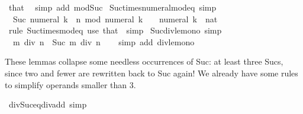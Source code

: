 \begin{isabellebody}
\ that\ \isamarkupfalse%
\ {\isacharparenleft}{\kern0pt}simp\ add{\isacharcolon}{\kern0pt}\ mod{\isacharunderscore}{\kern0pt}Suc{\isacharparenright}{\kern0pt}%
\endisatagproof
{\isafoldproof}%
%
\isadelimproof
\isanewline
%
\endisadelimproof
\isanewline
{}\isamarkupfalse%
\ Suc{\isacharunderscore}{\kern0pt}times{\isacharunderscore}{\kern0pt}numeral{\isacharunderscore}{\kern0pt}mod{\isacharunderscore}{\kern0pt}eq\ {\isacharbrackleft}{\kern0pt}simp{\isacharbrackright}{\kern0pt}{\isacharcolon}{\kern0pt}\isanewline
\ \ {\isachardoublequoteopen}Suc\ {\isacharparenleft}{\kern0pt}numeral\ k\ {\isacharasterisk}{\kern0pt}\ n{\isacharparenright}{\kern0pt}\ mod\ numeral\ k\ {\isacharequal}{\kern0pt}\ {}{\isachardoublequoteclose}\ \ {\isachardoublequoteopen}numeral\ k\ {\isasymnoteq}\ {\isacharparenleft}{\kern0pt}{}{\isacharcolon}{\kern0pt}{\isacharcolon}{\kern0pt}nat{\isacharparenright}{\kern0pt}{\isachardoublequoteclose}\isanewline
%
\isadelimproof
\ \ %
\endisadelimproof
%
\isatagproof
{}\isamarkupfalse%
\ {\isacharparenleft}{\kern0pt}rule\ Suc{\isacharunderscore}{\kern0pt}times{\isacharunderscore}{\kern0pt}mod{\isacharunderscore}{\kern0pt}eq{\isacharparenright}{\kern0pt}\ {\isacharparenleft}{\kern0pt}use\ that\ \ simp{\isacharparenright}{\kern0pt}%
\endisatagproof
{\isafoldproof}%
%
\isadelimproof
\isanewline
%
\endisadelimproof
\isanewline
{}\isamarkupfalse%
\ Suc{\isacharunderscore}{\kern0pt}div{\isacharunderscore}{\kern0pt}le{\isacharunderscore}{\kern0pt}mono\ {\isacharbrackleft}{\kern0pt}simp{\isacharbrackright}{\kern0pt}{\isacharcolon}{\kern0pt}\isanewline
\ \ {\isachardoublequoteopen}m\ div\ n\ {\isasymle}\ Suc\ m\ div\ n{\isachardoublequoteclose}\isanewline
%
\isadelimproof
\ \ %
\endisadelimproof
%
\isatagproof
{}\isamarkupfalse%
\ {\isacharparenleft}{\kern0pt}simp\ add{\isacharcolon}{\kern0pt}\ div{\isacharunderscore}{\kern0pt}le{\isacharunderscore}{\kern0pt}mono{\isacharparenright}{\kern0pt}%
\endisatagproof
{\isafoldproof}%
%
\isadelimproof
%
\endisadelimproof
%
\begin{isamarkuptext}%
These lemmas collapse some needless occurrences of Suc:
  at least three Sucs, since two and fewer are rewritten back to Suc again!
  We already have some rules to simplify operands smaller than 3.%
\end{isamarkuptext}\isamarkuptrue%
\isamarkupfalse%
\ div{\isacharunderscore}{\kern0pt}Suc{\isacharunderscore}{\kern0pt}eq{\isacharunderscore}{\kern0pt}div{\isacharunderscore}{\kern0pt}add{}\ {\isacharbrackleft}{\kern0pt}simp{\isacharbrackright}{\kern0pt}{\isacharcolon}{\kern0pt}\isanewline

\end{isabellebody}
